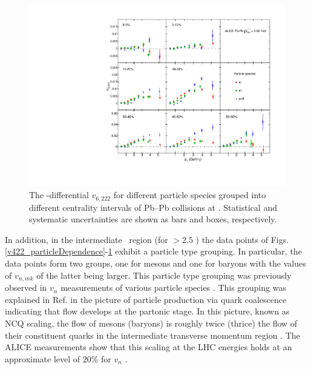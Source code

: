 \begin{figure}[!htb]
\begin{center}
\includegraphics[scale=0.82]{figures/results/All_v6222_gap00_PID2_3by3.pdf}

\end{center}
\caption{The \pT-differential $v_{6,222}$ for different particle species grouped into different centrality intervals of Pb--Pb collisions at \sNN. Statistical and systematic uncertainties are shown as bars and boxes, respectively.}
\label{v6222_particleDependence}
\end{figure}

\newpage

In addition, in the intermediate \pT~region (for \pT $> 2.5$ \GeV) the data points of Figs. \ref{v422_particleDependence}-\ref{v6222_particleDependence} exhibit a particle type grouping. In particular, the data points form two groups, one for mesons and one for baryons with the values of $v_{n,mk}$ of the latter being larger. This particle type grouping was previously observed in $v_{n}$ measurements of various particle species \cite{Abelev:2014pua,Adam:2016nfo,Acharya:2018zuq,Adams:2003am,Abelev:2007qg,Adler:2003kt,Adare:2006ti}. 
This grouping was explained in Ref. \cite{Molnar:2003ff} in the picture of particle production via quark coalescence indicating that flow develops at the partonic stage. In this picture, known as NCQ scaling, the flow of mesons (baryons) is roughly twice (thrice) the flow of their constituent quarks in the intermediate transverse momentum region \cite{Voloshin:2002wa,Molnar:2003ff}. The ALICE measurements show that this scaling at the LHC energies holds at an approximate level of 20\% for $v_{n}$ \cite{Abelev:2014pua,Adam:2016nfo,Acharya:2018zuq}. 

